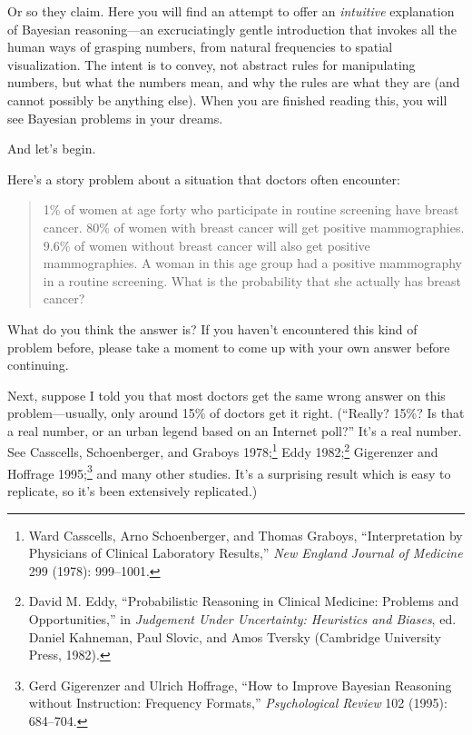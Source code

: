 {
 Or so they claim. Here you will find an attempt to offer an
\textit{intuitive} explanation of Bayesian reasoning---an
excruciatingly gentle introduction that invokes all the human ways of
grasping numbers, from natural frequencies to spatial visualization.
The intent is to convey, not abstract rules for manipulating numbers,
but what the numbers mean, and why the rules are what they are (and
cannot possibly be anything else). When you are finished reading this,
you will see Bayesian problems in your dreams.}

{
 And let's begin.}

\hr

{
 Here's a story problem about a situation that
doctors often encounter:}

\begin{quote}
{
 1\% of women at age forty who participate in routine screening
have breast cancer. 80\% of women with breast cancer will get positive
mammographies. 9.6\% of women without breast cancer will also get
positive mammographies. A woman in this age group had a positive
mammography in a routine screening. What is the probability that she
actually has breast cancer?}
\end{quote}

{
 What do you think the answer is? If you haven't
encountered this kind of problem before, please take a moment to come
up with your own answer before continuing.}

\hr

{
 Next, suppose I told you that most doctors get the same wrong
answer on this problem---usually, only around 15\% of doctors get it
right. (``Really? 15\%? Is that a real number, or an
urban legend based on an Internet poll?''
It's a real number. See Casscells, Schoenberger, and
Graboys 1978;\footnote{Ward Casscells, Arno Schoenberger, and Thomas Graboys,
``Interpretation by Physicians of Clinical Laboratory
Results,'' \textit{New England Journal of Medicine}
299 (1978): 999--1001.} Eddy 1982;\footnote{David M. Eddy, ``Probabilistic Reasoning in
Clinical Medicine: Problems and Opportunities,'' in
\textit{Judgement Under Uncertainty: Heuristics and Biases}, ed. Daniel
Kahneman, Paul Slovic, and Amos Tversky (Cambridge University Press,
1982).}
Gigerenzer and Hoffrage 1995;\footnote{Gerd Gigerenzer and Ulrich Hoffrage, ``How to
Improve Bayesian Reasoning without Instruction: Frequency
Formats,'' \textit{Psychological Review} 102 (1995):
684--704.} and many other
studies. It's a surprising result which is easy to
replicate, so it's been extensively replicated.)}

